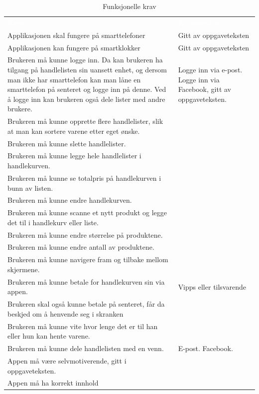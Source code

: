 \begin{table}[H]
    \caption{Funksjonelle krav}
    \label{tab:funksjonelle}
    \centering
    \begin{tabular}{|L{25em} L{18em}|}
    \hline
        \textbf{\textcolor{white}{Krav}} & \textbf{\textcolor{white}{Kommentar}}\\
        Applikasjonen skal fungere på smarttelefoner & Gitt av oppgaveteksten\\
        Applikasjonen kan fungere på smartklokker & Gitt av oppgaveteksten
        \\
        Brukeren må kunne logge inn. Da kan brukeren ha tilgang på handlelisten sin uansett enhet, og dersom man ikke har smarttelefon kan man låne en smarttelefon på senteret og logge inn på denne. Ved å logge inn kan brukeren også dele lister med andre brukere. & Logge inn via e-post. Logge inn via Facebook, gitt av oppgaveteksten. \\ 
        Brukeren må kunne opprette flere handlelister, slik at man kan sortere varene etter eget ønske. &\\
        Brukeren må kunne slette handlelister. &\\
        Brukeren må kunne legge hele handlelister i handlekurven. &\\
        Brukeren må kunne se totalpris på handlekurven i bunn av listen. &\\
        Brukeren må kunne endre handlekurven. &\\
        Brukeren må kunne scanne et nytt produkt og legge det til i handlekurv eller liste. &\\
        Brukeren må kunne endre størrelse på produktene. &\\
        Brukeren må kunne endre antall av produktene. &\\
        Brukeren må kunne navigere fram og tilbake mellom skjermene. &\\
        Brukeren må kunne betale for handlekurven sin via appen. & Vipps eller tilsvarende\\
        Brukeren skal også kunne betale på senteret, får da beskjed om å henvende seg i skranken &\\
        Brukeren må kunne vite hvor lenge det er til han eller hun kan hente varene. & \\
        Brukeren må kunne dele handlelisten med en venn. & E-post. Facebook.\\
        Appen må være selvmotiverende, gitt i oppgaveteksten. & \\
        Appen må ha korrekt innhold & \\
        \hline
    \end{tabular}
\end{table}

